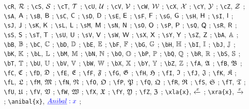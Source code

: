 \verb|\cR|, $\mathcal{R}$ ; 
\verb|\cS|, $\mathcal{S}$ ; 
\verb|\cT|, $\mathcal{T}$ ; 
\verb|\cU|, $\mathcal{U}$ ; 
\verb|\cV|, $\mathcal{V}$ ; 
\verb|\cW|, $\mathcal{W}$ ; 
\verb|\cX|, $\mathcal{X}$ ; 
\verb|\cY|, $\mathcal{Y}$ ; 
\verb|\cZ|, $\mathcal{Z}$ ; 
\verb|\sA|, $\mathsf{A}$ ; 
\verb|\sB|, $\mathsf{B}$ ; 
\verb|\sC|, $\mathsf{C}$ ; 
\verb|\sD|, $\mathsf{D}$ ; 
\verb|\sE|, $\mathsf{E}$ ; 
\verb|\sF|, $\mathsf{F}$ ; 
\verb|\sG|, $\mathsf{G}$ ; 
\verb|\sH|, $\mathsf{H}$ ; 
\verb|\sI|, $\mathsf{I}$ ; 
\verb|\sJ|, $\mathsf{J}$ ; 
\verb|\sK|, $\mathsf{K}$ ; 
\verb|\sL|, $\mathsf{L}$ ; 
\verb|\sM|, $\mathsf{M}$ ; 
\verb|\sN|, $\mathsf{N}$ ; 
\verb|\sO|, $\mathsf{O}$ ; 
\verb|\sP|, $\mathsf{P}$ ; 
\verb|\sQ|, $\mathsf{Q}$ ; 
\verb|\sR|, $\mathsf{R}$ ; 
\verb|\sS|, $\mathsf{S}$ ; 
\verb|\sT|, $\mathsf{T}$ ; 
\verb|\sU|, $\mathsf{U}$ ; 
\verb|\sV|, $\mathsf{V}$ ; 
\verb|\sW|, $\mathsf{W}$ ; 
\verb|\sX|, $\mathsf{X}$ ; 
\verb|\sY|, $\mathsf{Y}$ ; 
\verb|\sZ|, $\mathsf{Z}$ ; 
\verb|\bA|, $\mathbb{A}$ ; 
\verb|\bB|, $\mathbb{B}$ ; 
\verb|\bC|, $\mathbb{C}$ ; 
\verb|\bD|, $\mathbb{D}$ ; 
\verb|\bE|, $\mathbb{E}$ ; 
\verb|\bF|, $\mathbb{F}$ ; 
\verb|\bG|, $\mathbb{G}$ ; 
\verb|\bH|, $\mathbb{H}$ ; 
\verb|\bI|, $\mathbb{I}$ ; 
\verb|\bJ|, $\mathbb{J}$ ; 
\verb|\bK|, $\mathbb{K}$ ; 
\verb|\bL|, $\mathbb{L}$ ; 
\verb|\bM|, $\mathbb{M}$ ; 
\verb|\bN|, $\mathbb{N}$ ; 
\verb|\bO|, $\mathbb{O}$ ; 
\verb|\bP|, $\mathbb{P}$ ; 
\verb|\bQ|, $\mathbb{Q}$ ; 
\verb|\bR|, $\mathbb{R}$ ; 
\verb|\bS|, $\mathbb{S}$ ; 
\verb|\bT|, $\mathbb{T}$ ; 
\verb|\bU|, $\mathbb{U}$ ; 
\verb|\bV|, $\mathbb{V}$ ; 
\verb|\bW|, $\mathbb{W}$ ; 
\verb|\bX|, $\mathbb{X}$ ; 
\verb|\bY|, $\mathbb{Y}$ ; 
\verb|\bZ|, $\mathbb{Z}$ ; 
\verb|\fA|, $\mathfrak{A}$ ; 
\verb|\fB|, $\mathfrak{B}$ ; 
\verb|\fC|, $\mathfrak{C}$ ; 
\verb|\fD|, $\mathfrak{D}$ ; 
\verb|\fE|, $\mathfrak{E}$ ; 
\verb|\fF|, $\mathfrak{F}$ ; 
\verb|\fG|, $\mathfrak{G}$ ; 
\verb|\fH|, $\mathfrak{H}$ ; 
\verb|\fI|, $\mathfrak{I}$ ; 
\verb|\fJ|, $\mathfrak{J}$ ; 
\verb|\fK|, $\mathfrak{K}$ ; 
\verb|\fL|, $\mathfrak{L}$ ; 
\verb|\fM|, $\mathfrak{M}$ ; 
\verb|\fN|, $\mathfrak{N}$ ; 
\verb|\fO|, $\mathfrak{O}$ ; 
\verb|\fP|, $\mathfrak{P}$ ; 
\verb|\fQ|, $\mathfrak{Q}$ ; 
\verb|\fR|, $\mathfrak{R}$ ; 
\verb|\fS|, $\mathfrak{S}$ ; 
\verb|\fT|, $\mathfrak{T}$ ; 
\verb|\fU|, $\mathfrak{U}$ ; 
\verb|\fV|, $\mathfrak{V}$ ; 
\verb|\fW|, $\mathfrak{W}$ ; 
\verb|\fX|, $\mathfrak{X}$ ; 
\verb|\fY|, $\mathfrak{Y}$ ; 
\verb|\fZ|, $\mathfrak{Z}$ ; 
\verb|\xla{x}|, $\xleftarrow{x}$ ; 
\verb|\xra{x}|, $\xrightarrow{x}$ ; 
\verb|\anibal{x}|, $\anibal{x}$ ; 

